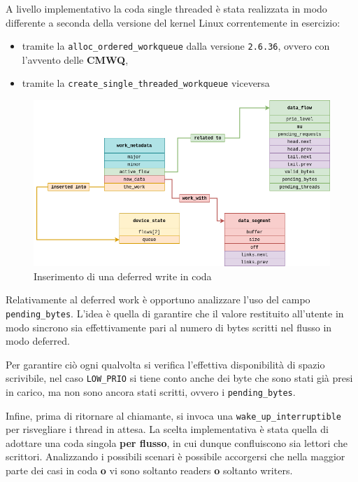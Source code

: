 \documentclass{article}
\begin{document}
A livello implementativo la coda single threaded è stata realizzata in modo differente a seconda della versione del kernel Linux correntemente in esercizio:
\begin{itemize}
        \item tramite la \texttt{alloc\_ordered\_workqueue} dalla versione \texttt{2.6.36}, ovvero con l'avvento delle \textbf{CMWQ},
        \item tramite la \texttt{create\_single\_threaded\_workqueue} viceversa
\end{itemize}

\begin{figure}[htbp]
        \centering
        \includegraphics[width=.8\textwidth]{deferred_work}
        \caption{Inserimento di una deferred write in coda}
        \label{fig:deferred_work}
\end{figure}

Relativamente al deferred work è opportuno analizzare l'uso del campo \texttt{pending\_bytes}. L'idea è quella di garantire che il valore restituito all'utente in modo sincrono sia effettivamente pari al numero di bytes scritti nel flusso in modo deferred.

Per garantire ciò ogni qualvolta si verifica l'effettiva disponibilità di spazio scrivibile, nel caso \texttt{LOW\_PRIO} si tiene conto anche dei byte che sono stati già presi in carico, ma non sono ancora stati scritti, ovvero i \texttt{pending\_bytes}.

Infine, prima di ritornare al chiamante, si invoca una \texttt{wake\_up\_interruptible} per risvegliare i thread in attesa. La scelta implementativa è stata quella di adottare una coda singola \textbf{per flusso}, in cui dunque confluiscono sia lettori che scrittori. Analizzando i possibili scenari è possibile accorgersi che nella maggior parte dei casi in coda \textbf{o} vi sono soltanto readers \textbf{o} soltanto writers.
\end{document}
